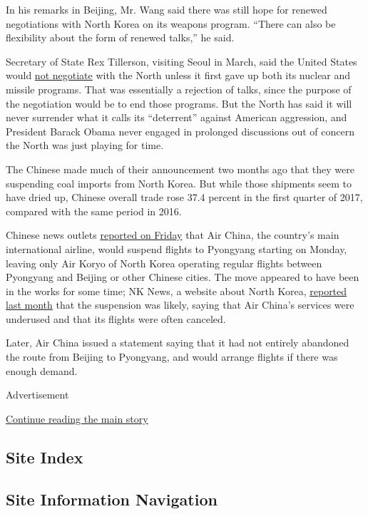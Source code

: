 In his remarks in Beijing, Mr. Wang said there was still hope for
renewed negotiations with North Korea on its weapons program. ``There
can also be flexibility about the form of renewed talks,'' he said.

Secretary of State Rex Tillerson, visiting Seoul in March, said the
United States would
\href{https://www.nytimes3xbfgragh.onion/2017/03/17/world/asia/rex-tillerson-north-korea-nuclear.html}{not
negotiate} with the North unless it first gave up both its nuclear and
missile programs. That was essentially a rejection of talks, since the
purpose of the negotiation would be to end those programs. But the North
has said it will never surrender what it calls its ``deterrent'' against
American aggression, and President Barack Obama never engaged in
prolonged discussions out of concern the North was just playing for
time.

The Chinese made much of their announcement two months ago that they
were suspending coal imports from North Korea. But while those shipments
seem to have dried up, Chinese overall trade rose 37.4 percent in the
first quarter of 2017, compared with the same period in 2016.

Chinese news outlets
\href{http://news.163.com/17/0414/19/CI0OMCIA0001875O.html}{reported on
Friday} that Air China, the country's main international airline, would
suspend flights to Pyongyang starting on Monday, leaving only Air Koryo
of North Korea operating regular flights between Pyongyang and Beijing
or other Chinese cities. The move appeared to have been in the works for
some time; NK News, a website about North Korea,
\href{https://www.nknews.org/2017/03/air-china-to-cancel-2017-north-korea-service-following-marathon/}{reported
last month} that the suspension was likely, saying that Air China's
services were underused and that its flights were often canceled.

Later, Air China issued a statement saying that it had not entirely
abandoned the route from Beijing to Pyongyang, and would arrange flights
if there was enough demand.

Advertisement

\protect\hyperlink{after-bottom}{Continue reading the main story}

\hypertarget{site-index}{%
\subsection{Site Index}\label{site-index}}

\hypertarget{site-information-navigation}{%
\subsection{Site Information
Navigation}\label{site-information-navigation}}

